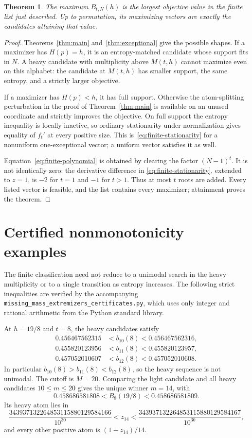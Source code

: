 \documentclass[11pt]{article}
\numberwithin{equation}{section}
\newtheorem{theorem}{Theorem}[section]
\begin{document}
\begin{theorem}\label{thm:finite-alphabet}
The maximum $B_{t,N}(h)$ is the largest objective value in the finite list
just described. Up to permutation, its maximizing vectors are exactly the
candidates attaining that value.
\end{theorem}
\begin{proof}
Theorems~\ref{thm:main} and~\ref{thm:exceptional} give the possible
shapes. If a maximizer has $H(p)=h$, it is an entropy-matched candidate
whose support fits in $N$. A heavy candidate with multiplicity above
$M(t,h)$ cannot maximize even on this alphabet: the candidate at
$M(t,h)$ has smaller support, the same entropy, and a strictly larger
objective.

If a maximizer has $H(p)<h$, it has full support. Otherwise the
atom-splitting perturbation in the proof of Theorem~\ref{thm:main} is
available on an unused coordinate and strictly improves the objective.
On full support the entropy inequality is locally inactive, so ordinary
stationarity under normalization gives equality of $f_t'$ at every
positive size. This is~\eqref{eq:finite-stationarity} for a nonuniform
one-exceptional vector; a uniform vector satisfies it as well.

Equation~\eqref{eq:finite-polynomial} is obtained by clearing the factor
$(N-1)^t$. It is not identically zero: the derivative difference in
\eqref{eq:finite-stationarity}, extended to $z=1$, is $-2$ for $t=1$
and $-1$ for $t>1$. Thus at most $t$ roots are added. Every listed vector
is feasible, and the list contains every maximizer; attainment proves
the theorem.
\end{proof}

\section{Certified nonmonotonicity examples}\label{app:certificates}
The finite classification need not reduce to a unimodal search in the
heavy multiplicity or to a single transition as entropy increases. The
following strict inequalities are verified by the accompanying
\texttt{missing\_mass\_extremizers\_certificates.py}, which uses only
integer and rational arithmetic from the Python standard library.

At $h=19/8$ and $t=8$, the heavy candidates satisfy
\begin{equation}\label{eq:nonunimodal-example}
 \begin{aligned}
 0.456467562315&<b_{10}(8)<0.456467562316,\\
 0.455820123956&<b_{11}(8)<0.455820123957,\\
 0.457052010607&<b_{12}(8)<0.457052010608.
 \end{aligned}
\end{equation}
In particular $b_{10}(8)>b_{11}(8)<b_{12}(8)$, so the heavy sequence is
not unimodal. The cutoff is $M=20$. Comparing the light candidate and all
heavy candidates $10\le m\le20$ gives the unique winner $m=14$, with
\[
 0.458686581808<B_8(19/8)<0.458686581809.
\]
Its heavy atom lies in
\[
 \frac{343937132264853115880129584166}{10^{30}}
 <z_{14}<
 \frac{343937132264853115880129584167}{10^{30}},
\]
and every other positive atom is $(1-z_{14})/14$.
\end{document}
